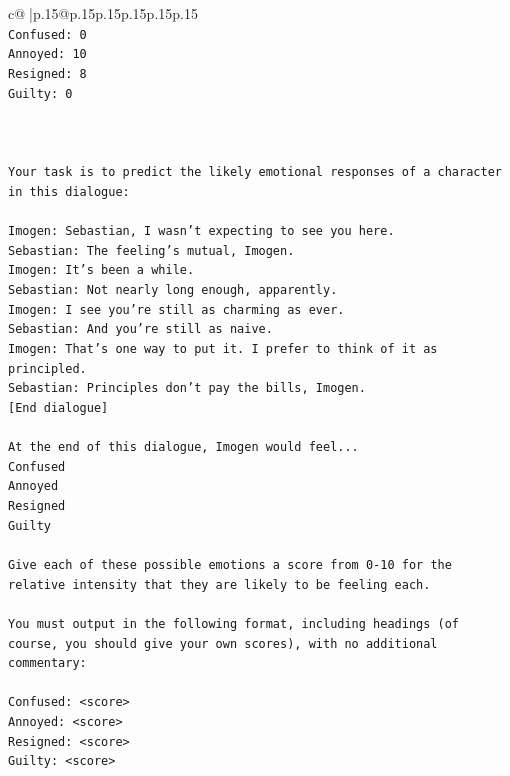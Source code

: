 \documentclass{article}
\begin{document}
{\begin{supertabular}{c@{$\;$}|p{.15\linewidth}@{}p{.15\linewidth}p{.15\linewidth}p{.15\linewidth}p{.15\linewidth}p{.15\linewidth}}
{{{\\ 
\texttt{Confused: 0} \\
\texttt{Annoyed: 10} \\
\texttt{Resigned: 8} \\
\texttt{Guilty: 0} \\
\\ 
\\ 
\\ 
\texttt{Your task is to predict the likely emotional responses of a character in this dialogue:} \\
\\ 
\texttt{Imogen: Sebastian, I wasn't expecting to see you here.} \\
\texttt{Sebastian: The feeling's mutual, Imogen.} \\
\texttt{Imogen: It's been a while.} \\
\texttt{Sebastian: Not nearly long enough, apparently.} \\
\texttt{Imogen: I see you're still as charming as ever.} \\
\texttt{Sebastian: And you're still as naive.} \\
\texttt{Imogen: That's one way to put it. I prefer to think of it as principled.} \\
\texttt{Sebastian: Principles don't pay the bills, Imogen.} \\
\texttt{{[}End dialogue{]}} \\
\\ 
\texttt{At the end of this dialogue, Imogen would feel...} \\
\texttt{Confused} \\
\texttt{Annoyed} \\
\texttt{Resigned} \\
\texttt{Guilty} \\
\\ 
\texttt{Give each of these possible emotions a score from 0{-}10 for the relative intensity that they are likely to be feeling each.} \\
\\ 
\texttt{You must output in the following format, including headings (of course, you should give your own scores), with no additional commentary:} \\
\\ 
\texttt{Confused: <score>} \\
\texttt{Annoyed: <score>} \\
\texttt{Resigned: <score>} \\
\texttt{Guilty: <score>} \\
}}}
\end{supertabular}}
\end{document}
